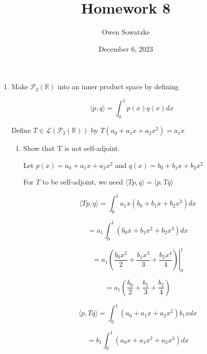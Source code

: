 \documentclass[fleqn]{article}
\title{Homework 8}
\author{Owen Sowatzke}
\date{December 6, 2023}
\makeatletter
\newcommand{\zerodisplayskip}{
	\setlength{\abovedisplayskip}{0pt}%
	\setlength{\belowdisplayskip}{0pt}%
	\setlength{\abovedisplayshortskip}{0pt}%
	\setlength{\belowdisplayshortskip}{0pt}%
	\setlength{\mathindent}{0pt}}
\newenvironment{equationCenter}{\@fleqnfalse\begin{equation*}}{\end{equation*}}
\makeatother
\begin{document}
	\offinterlineskip
	\setlength{\lineskip}{12pt}
	\zerodisplayskip
	\maketitle
	
	\begin{enumerate}[nolistsep]
		\item Make $\mathcal{P}_2(\mathbb{R})$ into an inner product space by defining
		
		\begin{equationCenter}
			\langle p, q\rangle = \int_{0}^{1}{p(x)q(x)dx}
		\end{equationCenter}
		
		Define $T \in \mathcal{L}(\mathcal{P}_2(\mathbb{R}))$ by $T(a_0 + a_1x + a_2x^2) = a_1x$
		
		\begin{enumerate}[nolistsep]
			\item Show that T is not self-adjoint.
			
			Let $p(x) = a_0 + a_1x + a_2x^2$ and $q(x) = b_0 + b_1x + b_2x^2$
			
			For $T$ to be self-adjoint, we need $\langle Tp, q \rangle = \langle p, Tq \rangle$
			
			\begin{equation*}
				\langle Tp, q \rangle = \int_{0}^{1}{a_1x(b_0 + b_1x + b_2x^2)dx}
			\end{equation*}
			
			\begin{equation*}
				= a_1\int_{0}^{1}{(b_0x + b_1x^2 + b_2x^3)dx}
			\end{equation*}
			
			\begin{equation*}
				= a_1\left.\left(\frac{b_0x^2}{2} + \frac{b_1x^3}{3} + \frac{b_2x^4}{4}\right)\right\vert_{0}^{1}
			\end{equation*}
			
			\begin{equation*}
				= a_1\left(\frac{b_0}{2} + \frac{b_1}{3} + \frac{b_2}{4}\right)
			\end{equation*}
			
			\begin{equation*}
				\langle p, Tq \rangle = \int_{0}^{1}{(a_0 + a_1x + a_2x^2)b_1xdx}
			\end{equation*}
			
			\begin{equation*}
				= b_1\int_{0}^{1}{(a_0x + a_1x^2 + a_2x^3)dx}
			\end{equation*}
			

\end{enumerate}
\end{enumerate}
\end{document}

